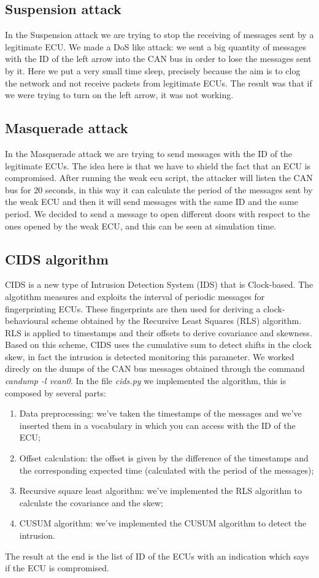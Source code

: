 \documentclass[12pt]{article}
\begin{document}
\subsection{Suspension attack}
In the Suspension attack we are trying to stop the receiving of messages sent by a legitimate ECU. We made 
a DoS like attack: we sent a big quantity of messages with the ID of the left arrow into the CAN bus in order 
to lose the messages sent by it. Here we put a very small time sleep, precisely because the aim is to clog 
the network and not receive packets from legitimate ECUs. The result was that if we were trying to turn on 
the left arrow, it was not working.
\subsection{Masquerade attack}
In the Masquerade attack we are trying to send messages with the ID of the legitimate ECUs. The idea here 
is that we have to shield the fact that an ECU is compromised. After running the weak ecu script, the 
attacker will listen the CAN bus for 20 seconds, in this way it can calculate the period of the messages 
sent by the weak ECU and then it will send messages with the same ID and the same period. We decided to 
send a message to open different doors with respect to the ones opened by the weak ECU, and this can be 
seen at simulation time.
\subsection{CIDS algorithm}
CIDS is a new type of Intrusion Detection System (IDS) that is Clock-based. The algotithm measures and 
exploits the interval of periodic messages for fingerprinting ECUs. These fingerprints are then used for 
deriving a clock-behavioural scheme obtained by the Recursive Least Squares (RLS) algorithm. RLS is 
applied to timestamps and their offsets to derive covariance and skewness. Based on this scheme, 
CIDS uses the cumulative sum to detect shifts in the clock skew, in fact the intrusion is detected 
monitoring this parameter. We worked direcly on the dumps of the CAN bus messages obtained through the command 
\textit{candump -l vcan0}.
In the file \textit{cids.py} we implemented the algorithm, this is composed by several 
parts:
\begin{enumerate}
    \item Data preprocessing: we've taken the timestamps of the messages and we've inserted them 
    in a vocabulary in which you can access with the ID of the ECU;
    \item Offset calculation: the offset is given by the difference of the timestamps and the corresponding
    expected time (calculated with the period of the messages);
    \item Recursive square least algorithm: we've implemented the RLS algorithm to calculate the covariance 
    and the skew;
    \item CUSUM algorithm: we've implemented the CUSUM algorithm to detect the intrusion. 
\end{enumerate}
The result at the end is the list of ID of the ECUs with an indication which says if the ECU is compromised.
\end{document}
